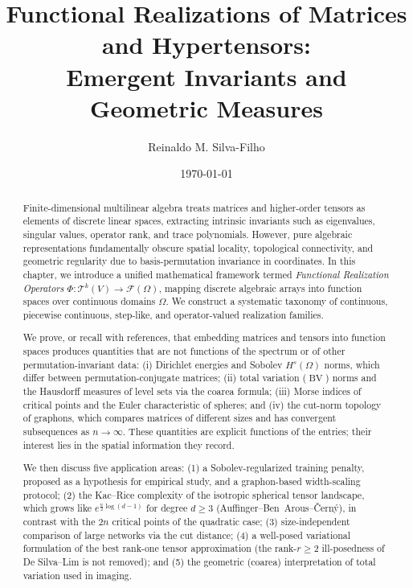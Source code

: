 \documentclass[11pt,a4paper,reqno]{amsart}
\title[Functional Realizations of Matrices and Hypertensors]{Functional Realizations of Matrices and Hypertensors:\\ Emergent Invariants and Geometric Measures}
\author{Reinaldo M. Silva-Filho}
\date{\today}
\theoremstyle{definition}
\numberwithin{equation}{section}
\providecommand{\BV}{\operatorname{BV}}
\begin{document}
\begin{abstract}
Finite-dimensional multilinear algebra treats matrices and higher-order tensors as elements of discrete linear spaces, extracting intrinsic invariants such as eigenvalues, singular values, operator rank, and trace polynomials. However, pure algebraic representations fundamentally obscure spatial locality, topological connectivity, and geometric regularity due to basis-permutation invariance in coordinates. In this chapter, we introduce a unified mathematical framework termed \emph{Functional Realization Operators} $\Phi \colon \mathcal{T}^k(V) \to \mathcal{F}(\Omega)$, mapping discrete algebraic arrays into function spaces over continuous domains $\Omega$. We construct a systematic taxonomy of continuous, piecewise continuous, step-like, and operator-valued realization families.

We prove, or recall with references, that embedding matrices and tensors into function spaces produces quantities that are not functions of the spectrum or of other permutation-invariant data: (i) Dirichlet energies and Sobolev $H^s(\Omega)$ norms, which differ between permutation-conjugate matrices; (ii) total variation ($\BV$) norms and the Hausdorff measures of level sets via the coarea formula; (iii) Morse indices of critical points and the Euler characteristic of spheres; and (iv) the cut-norm topology of graphons, which compares matrices of different sizes and has convergent subsequences as $n \to \infty$. These quantities are explicit functions of the entries; their interest lies in the spatial information they record.

We then discuss five application areas: (1) a Sobolev-regularized training penalty, proposed as a hypothesis for empirical study, and a graphon-based width-scaling protocol; (2) the Kac--Rice complexity of the isotropic spherical tensor landscape, which grows like $e^{\frac{n}{2}\log(d-1)}$ for degree $d \ge 3$ (Auffinger--Ben~Arous--\v{C}ern\'y), in contrast with the $2n$ critical points of the quadratic case; (3) size-independent comparison of large networks via the cut distance; (4) a well-posed variational formulation of the best rank-one tensor approximation (the rank-$r \ge 2$ ill-posedness of De Silva--Lim is not removed); and (5) the geometric (coarea) interpretation of total variation used in imaging.
\end{abstract}

\end{document}
